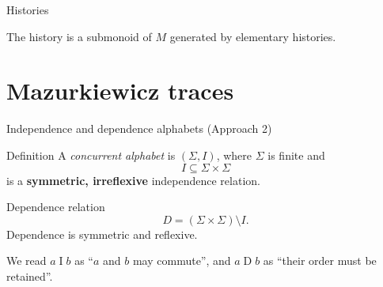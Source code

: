 \documentclass[t,11pt]{beamer}
\newcommand{\ind}{\mathrel{I}}
\newcommand{\dep}{\mathrel{D}}
\begin{document}
\begin{frame}{Histories}

\begin{block}{The history is}
a submonoid of $M$ generated by elementary histories.
\end{block}

\end{frame}







\section{Mazurkiewicz traces}

\newcommand{\Ind}{I}
\newcommand{\Dep}{D}


\begin{frame}{Independence and dependence alphabets (Approach 2)}
  \begin{block}{Definition}
    A \emph{concurrent alphabet} is $(\Sigma,I)$, where $\Sigma$ is finite and
    \[
       \Ind\subseteq\Sigma\times\Sigma
    \]
    is a \textbf{symmetric, irreflexive} independence relation.
  \end{block}
  \begin{block}{Dependence relation}
    \[
      D=(\Sigma\times\Sigma)\setminus I.
    \]
    Dependence is symmetric and reflexive.
  \end{block}
  \vspace{0.1cm}
  We read $a\ind b$ as ``$a$ and $b$ may commute'', and $a\dep b$ as ``their order must be retained''.
\end{frame}
\end{document}

